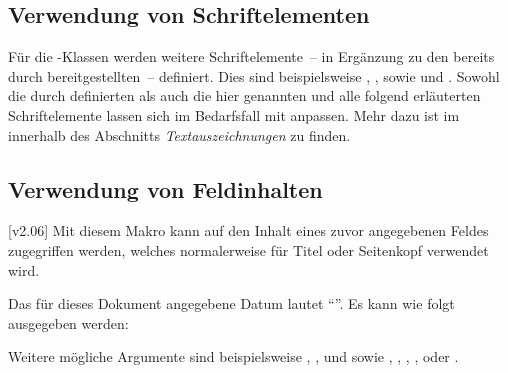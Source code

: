 \begin{DeclareEntity*}{}
\begin{DeclareEntity*}{}
\begin{DeclareEntity*}{}
\subsection{%
  Verwendung von Schriftelementen%
  \label{sec:fonts:elements}%
}
%
Für die \TUDScript-Klassen werden weitere Schriftelemente~-- in Ergänzung zu 
den bereits durch \KOMAScript bereitgestellten~-- definiert. Dies sind 
beispielsweise , ,  sowie 
 und . Sowohl die durch \KOMAScript 
definierten als auch die hier genannten und alle folgend erläuterten 
Schriftelemente lassen sich im Bedarfsfall mit 
 anpassen. 
Mehr dazu ist im \scrguide innerhalb des Abschnitts \emph{Textauszeichnungen} 
zu finden.

\begin{quoting}[rightmargin=0pt]
\begin{Code}[escapechar=§]
\end{Code}
\end{quoting}



\subsection{%
  Verwendung von Feldinhalten%
}
%
\begin{Declaration}
  {}
  [v2.06]
\printdeclarationlist
%
Mit diesem Makro kann auf den Inhalt eines zuvor angegebenen Feldes zugegriffen 
werden, welches normalerweise für Titel oder Seitenkopf verwendet wird. 
%
\begin{Example}
Das für dieses Dokument angegebene Datum lautet \enquote{}. Es 
kann wie folgt ausgegeben werden:
\begin{Code}
\end{Code}
\end{Example}
%
Weitere mögliche Argumente sind beispielsweise , 
,  und  sowie ,
, , ,  oder
.
\end{Declaration}




\end{DeclareEntity*}
\end{DeclareEntity*}
\end{DeclareEntity*}
